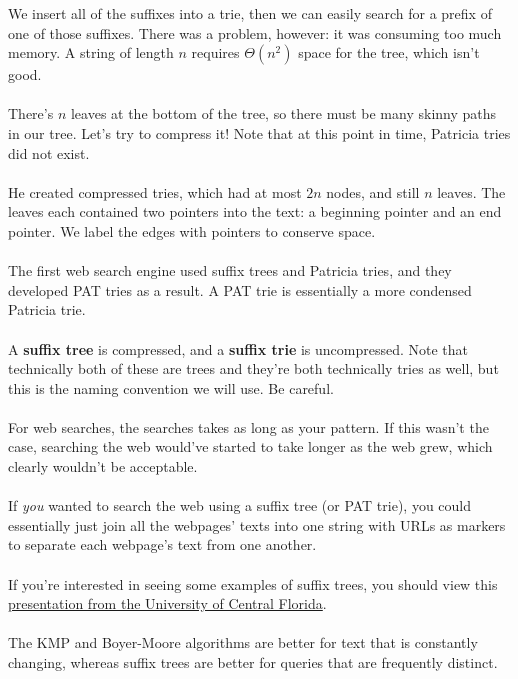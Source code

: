 \documentclass[]{article}
\theoremstyle{definition}
\begin{document}
				We insert all of the suffixes into a trie, then we can easily search for a prefix of one of those suffixes. There was a problem, however: it was consuming too much memory. A string of length $n$ requires $\Theta(n^2)$ space for the tree, which isn't good.
				\\ \\
				There's $n$ leaves at the bottom of the tree, so there must be many skinny paths in our tree. Let's try to compress it! Note that at this point in time, Patricia tries did not exist.
				\\ \\
				He created compressed tries, which had at most $2n$ nodes, and still $n$ leaves. The leaves each contained two pointers into the text: a beginning pointer and an end pointer. We label the edges with pointers to conserve space.
				\\ \\
				The first web search engine used suffix trees and Patricia tries, and they developed PAT tries as a result. A PAT trie is essentially a more condensed Patricia trie.
				\\ \\
				A \textbf{suffix tree} is compressed, and a \textbf{suffix trie} is uncompressed. Note that technically both of these are trees and they're both technically tries as well, but this is the naming convention we will use. Be careful.
				\\ \\
				For web searches, the searches takes as long as your pattern. If this wasn't the case, searching the web would've started to take longer as the web grew, which clearly wouldn't be acceptable.
				\\ \\
				If \emph{you} wanted to search the web using a suffix tree (or PAT trie), you could essentially just join all the webpages' texts into one string with URLs as markers to separate each webpage's text from one another.
				\\ \\
				If you're interested in seeing some examples of suffix trees, you should view this \href{http://www.cs.ucf.edu/~shzhang/Combio12/lec3.pdf}{presentation from the University of Central Florida}.
				\\ \\
				The KMP and Boyer-Moore algorithms are better for text that is constantly changing, whereas suffix trees are better for queries that are frequently distinct.
\end{document}
